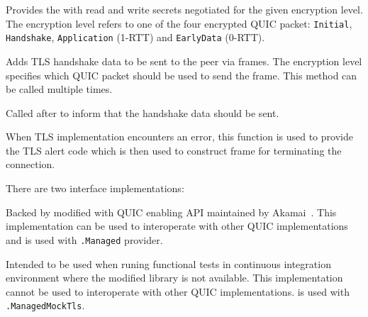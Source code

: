 \begin{description}

   Provides the \ManagedQuicConnection{} with read
and write secrets negotiated for the given encryption level. The encryption level refers to one of
the four encrypted QUIC packet: \texttt{Initial}, \texttt{Handshake}, \texttt{Application} (1-RTT)
and \texttt{EarlyData} (0-RTT).

Adds TLS handshake data to be sent to the peer via \CRYPTO{} frames. The encryption level specifies
which QUIC packet should be used to send the \CRYPTO{} frame. This method can be called multiple
times.

   Called after  to
inform \ManagedQuicConnection{} that the handshake data should be sent.

   When TLS implementation
encounters an error, this function is used to provide the TLS alert code which is then used to
construct \CONNECTIONCLOSE{} frame for terminating the connection.

\end{description}

There are two \ITls{} interface implementations:

\begin{itemize}

  \litem[]{\OpenSslTls{}} Backed by modified \libopenssl{} with QUIC enabling API maintained by
Akamai~\cite{AkamaiOpensslGithub}. This implementation can be used to interoperate with other QUIC implementations and is used with \texttt{\QuicImplementationProviders{}\allowbreak{}.Managed} provider.

  \litem[]{\MockTls{}} Intended to be used when runing functional tests in continuous integration environment where the modified \libopenssl{} library is not available. This implementation cannot be used to interoperate with other QUIC implementations. \MockTls{} is used with \texttt{\QuicImplementationProviders{}\allowbreak{}.ManagedMockTls}.

\end{itemize}

